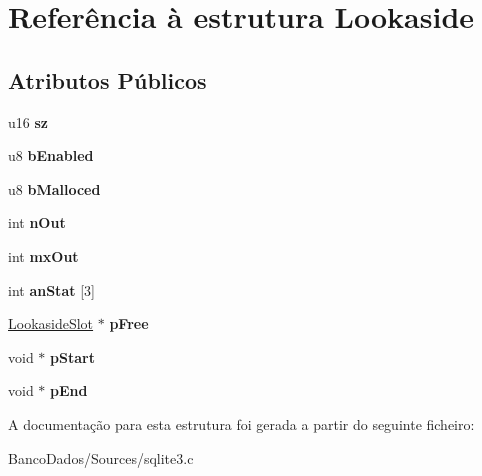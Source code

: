 \hypertarget{struct_lookaside}{\section{Referência à estrutura Lookaside}
\label{struct_lookaside}
}
\subsection*{Atributos Públicos}
\begin{DoxyCompactItemize}
\item 
\hypertarget{struct_lookaside_a2e8346b6cebbb64d9a6886a19ef843a1}{u16 {\bfseries sz}}\label{struct_lookaside_a2e8346b6cebbb64d9a6886a19ef843a1}

\item 
\hypertarget{struct_lookaside_adbe2c3486f893c30525e19388f35eb21}{u8 {\bfseries b\-Enabled}}\label{struct_lookaside_adbe2c3486f893c30525e19388f35eb21}

\item 
\hypertarget{struct_lookaside_a218f14cf9eb2c430867d286e9ac57ac5}{u8 {\bfseries b\-Malloced}}\label{struct_lookaside_a218f14cf9eb2c430867d286e9ac57ac5}

\item 
\hypertarget{struct_lookaside_a4cdd49fa554f877928d5bb31d55b32e9}{int {\bfseries n\-Out}}\label{struct_lookaside_a4cdd49fa554f877928d5bb31d55b32e9}

\item 
\hypertarget{struct_lookaside_a2ce364d95b55913df986999de442e4f9}{int {\bfseries mx\-Out}}\label{struct_lookaside_a2ce364d95b55913df986999de442e4f9}

\item 
\hypertarget{struct_lookaside_a7d875204cb05a327bb1652139faa4374}{int {\bfseries an\-Stat} \mbox{[}3\mbox{]}}\label{struct_lookaside_a7d875204cb05a327bb1652139faa4374}

\item 
\hypertarget{struct_lookaside_a318d2faa7f976f9d1b3c6e08bdc1d992}{\hyperlink{struct_lookaside_slot}{Lookaside\-Slot} $\ast$ {\bfseries p\-Free}}\label{struct_lookaside_a318d2faa7f976f9d1b3c6e08bdc1d992}

\item 
\hypertarget{struct_lookaside_a47073fcdffdc5a7a1464f0d09bfc17f9}{void $\ast$ {\bfseries p\-Start}}\label{struct_lookaside_a47073fcdffdc5a7a1464f0d09bfc17f9}

\item 
\hypertarget{struct_lookaside_ad3555c5558e104f2b82f62bf642cf831}{void $\ast$ {\bfseries p\-End}}\label{struct_lookaside_ad3555c5558e104f2b82f62bf642cf831}

\end{DoxyCompactItemize}


A documentação para esta estrutura foi gerada a partir do seguinte ficheiro\-:\begin{DoxyCompactItemize}
\item 
Banco\-Dados/\-Sources/sqlite3.\-c\end{DoxyCompactItemize}
